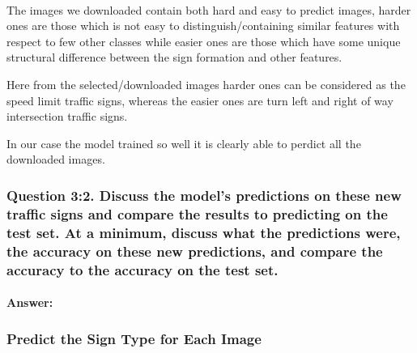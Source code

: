 \documentclass[11pt]{article}
\begin{document}
    \begin{center}
    \end{center}
    { \hspace*{\fill} \\}
    
    The images we downloaded contain both hard and easy to predict images,
harder ones are those which is not easy to distinguish/containing
similar features with respect to few other classes while easier ones are
those which have some unique structural difference between the sign
formation and other features.

Here from the selected/downloaded images harder ones can be considered
as the speed limit traffic signs, whereas the easier ones are turn left
and right of way intersection traffic signs.

In our case the model trained so well it is clearly able to perdict all
the downloaded images.

    \subsubsection{Question 3:2. Discuss the model's predictions on these
new traffic signs and compare the results to predicting on the test set.
At a minimum, discuss what the predictions were, the accuracy on these
new predictions, and compare the accuracy to the accuracy on the test
set.}\label{question-32.-discuss-the-models-predictions-on-these-new-traffic-signs-and-compare-the-results-to-predicting-on-the-test-set.-at-a-minimum-discuss-what-the-predictions-were-the-accuracy-on-these-new-predictions-and-compare-the-accuracy-to-the-accuracy-on-the-test-set.}

    \paragraph{Answer:}\label{answer}

    \subsubsection{Predict the Sign Type for Each
Image}\label{predict-the-sign-type-for-each-image}
\end{document}
